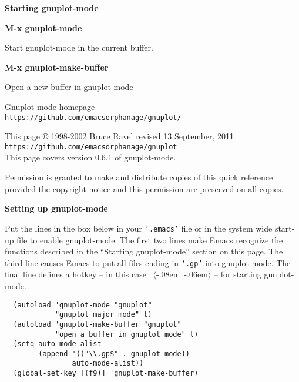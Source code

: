 \documentclass[twocolumn]{article}
\newenvironment{Boxedminipage}%
{\begin{Sbox}\begin{minipage}}%
  {\end{minipage}\end{Sbox}\Ovalbox{\TheSbox}}
\newenvironment{SqBoxedminipage}%
{\begin{Sbox}\begin{minipage}}%
  {\end{minipage}\end{Sbox}\fbox{\TheSbox}}
\def\version{{0.6.1}}
\def\revised{{13 September, 2011}}
\def\file#1{{\texttt{`#1'}}}
\def\key#1{{\textrm \leavevmode\hbox{%
  \raise0.4pt\hbox{$\langle$}\kern-.08em\vtop{%
    \vbox{\hrule\kern-0.4pt
     \hbox{\raise0.4pt\hbox{\vphantom{$\langle$}}#1}}%
    \kern-0.4pt\hrule}%
  \kern-.06em\raise0.4pt\hbox{$\rangle$}}}}
\def\command#1#2{{
    \vspace{-0.2truecm}
    \begin{flushright}
      \begin{minipage}[h]{0.97\linewidth}
        \vspace{-0.2truecm}
        \textbf{#1}\hfill
        \begin{flushright}
          \begin{minipage}[h]{0.93\linewidth}
            \vspace{-0.4truecm}
            #2
          \end{minipage}
        \end{flushright}
      \end{minipage}
    \end{flushright}
    }}
\begin{document}
\vspace{4ex}

\centerline{{\large\textbf{Starting gnuplot-mode}}}
\vspace{2ex}

\command{M-x gnuplot-mode}{Start gnuplot-mode in the current buffer.}
%
\command{M-x gnuplot-make-buffer}{Open a new buffer in gnuplot-mode}



\vfill

\begin{Boxedminipage}{1.05\linewidth}
  \begin{center}
    \footnotesize{Gnuplot-mode homepage} \\
    \scriptsize{%
      \texttt{https://github.com/emacsorphanage/gnuplot/}}
  \end{center}
\end{Boxedminipage}
\begin{flushleft}
  {\footnotesize
    This page {\copyright} 1998-2002 Bruce Ravel \hfill revised \revised \\
    \texttt{https://github.com/emacsorphanage/gnuplot} \\ %
    This page covers version {\version} of gnuplot-mode.

    Permission is granted to make and distribute copies of this quick
    reference provided the copyright notice and this permission are
    preserved on all copies.}
\end{flushleft}
\pagebreak
\centerline{{\large\textbf{Setting up gnuplot-mode}}}
\vspace{2ex}

Put the lines in the box below in your \file{.emacs} file or in the
system wide start-up file to enable gnuplot-mode.  The first two lines
make Emacs recognize the functions described in the ``Starting
gnuplot-mode'' section on this page.  The third line causes Emacs to
put all files ending in \file{.gp} into gnuplot-mode.  The final line
defines a hotkey -- in this case \key{F9} -- for starting
gnuplot-mode.

\begin{SqBoxedminipage}{\linewidth}
\begin{Verbatim}
  (autoload 'gnuplot-mode "gnuplot"
            "gnuplot major mode" t)
  (autoload 'gnuplot-make-buffer "gnuplot"
            "open a buffer in gnuplot mode" t)
  (setq auto-mode-alist
        (append '(("\\.gp$" . gnuplot-mode))
                auto-mode-alist))
  (global-set-key [(f9)] 'gnuplot-make-buffer)
\end{Verbatim}%
\end{SqBoxedminipage}
\end{document}
